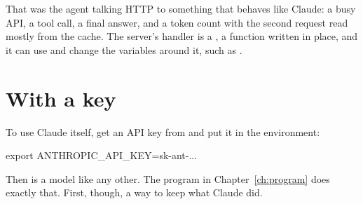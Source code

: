 That was the agent talking HTTP to something that behaves like Claude: a
busy API, a tool call, a final answer, and a token count with the second
request read mostly from the cache. The server's handler is a ,
a function written in place, and it can use and change the variables
around it, such as .

\section{With a key}

To use Claude itself, get an API key from  and
put it in the environment:

\begin{shell}
export ANTHROPIC_API_KEY=sk-ant-...
\end{shell}

Then  is a model like any other. The program in
Chapter~\ref{ch:program} does exactly that. First, though, a way to keep
what Claude did.
